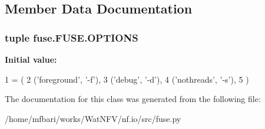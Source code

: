 \subsection{Member Data Documentation}
\hypertarget{classfuse_1_1FUSE_a7efd0e8f258fe7ed74a331d98f7541d7}{
\subsubsection[{O\-P\-T\-I\-O\-N\-S}]{\setlength{\rightskip}{0pt plus 5cm}tuple fuse.\-F\-U\-S\-E.\-O\-P\-T\-I\-O\-N\-S\hspace{0.3cm}{\ttfamily [static]}}}\label{classfuse_1_1FUSE_a7efd0e8f258fe7ed74a331d98f7541d7}
{\bfseries Initial value\-:}
\begin{DoxyCode}
1 = (
2         (\textcolor{stringliteral}{'foreground'}, \textcolor{stringliteral}{'-f'}),
3         (\textcolor{stringliteral}{'debug'}, \textcolor{stringliteral}{'-d'}),
4         (\textcolor{stringliteral}{'nothreads'}, \textcolor{stringliteral}{'-s'}),
5     )
\end{DoxyCode}


The documentation for this class was generated from the following file\-:\begin{DoxyCompactItemize}
\item 
/home/mfbari/works/\-Wat\-N\-F\-V/nf.\-io/src/fuse.\-py\end{DoxyCompactItemize}
